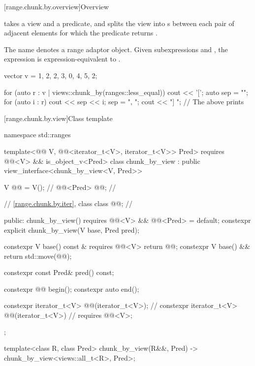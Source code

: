 [range.chunk.by.overview]{Overview}

\pnum
{} takes a view and a predicate, and
splits the view into s
between each pair of adjacent elements
for which the predicate returns .

\pnum
{}%
The name  denotes
a range adaptor object.
Given subexpressions  and ,
the expression  is expression-equivalent to
.
\begin{example}
\begin{codeblock}
vector v = {1, 2, 2, 3, 0, 4, 5, 2};

for (auto r : v | views::chunk_by(ranges::less_equal{})) {
  cout << '[';
  auto sep = "";
  for (auto i : r) {
    cout << sep << i;
    sep = ", ";
  }
  cout << "] ";
}
// The above prints \tcode{[1, 2, 2, 3] [0, 4, 5] [2]}
\end{codeblock}
\end{example}

[range.chunk.by.view]{Class template }

%
\begin{codeblock}
namespace std::ranges {
  template<@@ V, @@<iterator_t<V>, iterator_t<V>> Pred>
    requires @@<V> && is_object_v<Pred>
  class chunk_by_view : public view_interface<chunk_by_view<V, Pred>> {
    V @@ = V();                                          // \expos
    @@<Pred> @@;                                // \expos

    // \ref{range.chunk.by.iter}, class 
    class @@;                                         // \expos

  public:
    chunk_by_view() requires @@<V> && @@<Pred> = default;
    constexpr explicit chunk_by_view(V base, Pred pred);

    constexpr V base() const & requires @@<V> { return @@; }
    constexpr V base() && { return std::move(@@); }

    constexpr const Pred& pred() const;

    constexpr @@ begin();
    constexpr auto end();

    constexpr iterator_t<V> @@(iterator_t<V>);       // \expos
    constexpr iterator_t<V> @@(iterator_t<V>)        // \expos
      requires @@<V>;
  };

  template<class R, class Pred>
    chunk_by_view(R&&, Pred) -> chunk_by_view<views::all_t<R>, Pred>;
}
\end{codeblock}


